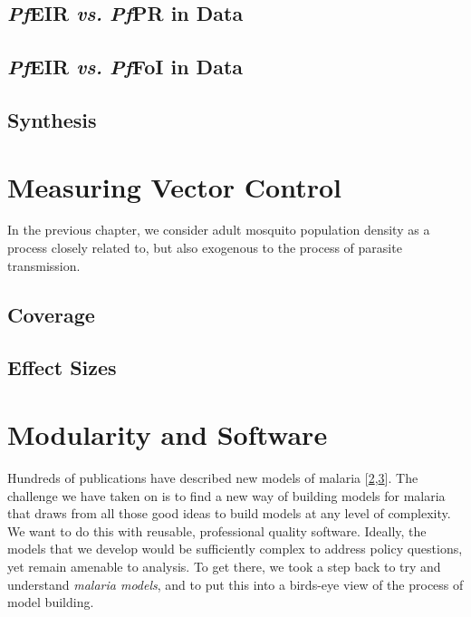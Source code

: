 \documentclass[
]{book}
\begin{document}
\hypertarget{pfeir-vs.-pfpr-in-data}{%
\section{\texorpdfstring{\emph{Pf}EIR \emph{vs.} \emph{Pf}PR in Data}{PfEIR vs. PfPR in Data}}\label{pfeir-vs.-pfpr-in-data}}

\hypertarget{pfeir-vs.-pffoi-in-data}{%
\section{\texorpdfstring{\emph{Pf}EIR \emph{vs.} \emph{Pf}FoI in Data}{PfEIR vs. PfFoI in Data}}\label{pfeir-vs.-pffoi-in-data}}

\hypertarget{synthesis-1}{%
\section{Synthesis}\label{synthesis-1}}

\hypertarget{measuring-vector-control}{%
\chapter{Measuring Vector Control}\label{measuring-vector-control}}

In the previous chapter, we consider adult mosquito population density as a process closely related to, but also exogenous to the process of parasite transmission.

\hypertarget{coverage}{%
\section{Coverage}\label{coverage}}

\hypertarget{effect-sizes}{%
\section{Effect Sizes}\label{effect-sizes}}

\hypertarget{modularity-and-software}{%
\chapter{Modularity and Software}\label{modularity-and-software}}

Hundreds of publications have described new models of malaria {[}\protect\hyperlink{ref-ReinerRCJ2013SystematicReview}{2},\protect\hyperlink{ref-SmithNR2018AgentbasedModels}{3}{]}. The challenge we have taken on is to find a new way of building models for malaria that draws from all those good ideas to build models at any level of complexity. We want to do this with reusable, professional quality software. Ideally, the models that we develop would be sufficiently complex to address policy questions, yet remain amenable to analysis. To get there, we took a step back to try and understand \emph{malaria models}, and to put this into a birds-eye view of the process of model building.
\end{document}
